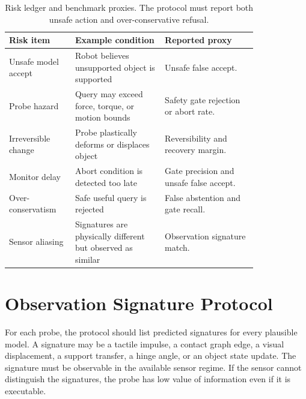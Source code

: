 \documentclass{article}
\begin{document}
\begin{table}[p]
\centering
\small
\begin{tabular}{p{0.21\linewidth}p{0.30\linewidth}p{0.31\linewidth}}
\toprule
Risk item & Example condition & Reported proxy \\
\midrule
Unsafe model accept & Robot believes unsupported object is supported & Unsafe false accept. \\
Probe hazard & Query may exceed force, torque, or motion bounds & Safety gate rejection or abort rate. \\
Irreversible change & Probe plastically deforms or displaces object & Reversibility and recovery margin. \\
Monitor delay & Abort condition is detected too late & Gate precision and unsafe false accept. \\
Over-conservatism & Safe useful query is rejected & False abstention and gate recall. \\
Sensor aliasing & Signatures are physically different but observed as similar & Observation signature match. \\
\bottomrule
\end{tabular}
\caption{Risk ledger and benchmark proxies. The protocol must report both unsafe action and over-conservative refusal.}
\label{tab:risk_ledger}
\end{table}

\section{Observation Signature Protocol}

For each probe, the protocol should list predicted signatures for every plausible model. A signature may be a tactile impulse, a contact graph edge, a visual displacement, a support transfer, a hinge angle, or an object state update. The signature must be observable in the available sensor regime. If the sensor cannot distinguish the signatures, the probe has low value of information even if it is executable.
\end{document}
